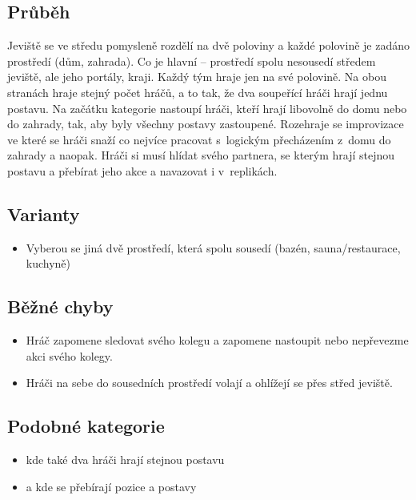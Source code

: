 \subsection{Průběh} Jeviště se ve středu pomysleně rozdělí na dvě poloviny a každé polovině je zadáno prostředí (dům, zahrada). Co je hlavní – prostředí spolu nesousedí středem jeviště, ale jeho portály, kraji. Každý tým hraje jen na své polovině. Na obou stranách hraje stejný počet hráčů, a to tak, že dva soupeřící hráči hrají jednu postavu. Na začátku kategorie nastoupí hráči, kteří hrají libovolně do domu nebo do zahrady, tak, aby byly všechny postavy zastoupené. Rozehraje se improvizace ve které se hráči snaží co nejvíce pracovat s~logickým přecházením z~domu do zahrady a naopak. Hráči si musí hlídat svého partnera, se kterým hrají stejnou postavu a přebírat jeho akce a navazovat i v~replikách. 
 
\subsection{ Varianty } \begin{itemize}
\item Vyberou se jiná dvě prostředí, která spolu sousedí (bazén, sauna/restaurace, kuchyně)
\end{itemize}
 
\subsection{ Běžné chyby } \begin{itemize}
\item Hráč zapomene sledovat svého kolegu a zapomene nastoupit nebo nepřevezme akci svého kolegy.
\item Hráči na sebe do sousedních prostředí volají a ohlížejí se přes střed jeviště.
\end{itemize}
\subsection{Podobné kategorie} \begin{itemize}
\item {} kde také dva hráči hrají stejnou postavu
\item  {} a  kde se přebírají pozice a postavy
\end{itemize}
 
 
 
